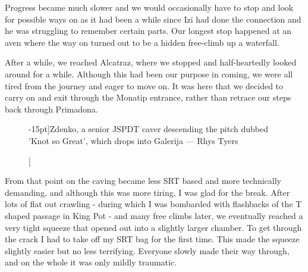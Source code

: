 Progress became much slower and we would occasionally have to stop and look for possible ways on as it had been a while since Izi had done the connection and he was struggling to remember certain parts. Our longest stop happened at an aven where the way on turned out to be a hidden free-climb up a waterfall.

After a while, we reached Alcatraz, where we stopped and half-heartedly looked around for a while. Although this had been our purpose in coming, we were all tired from the journey and eager to move on. It was here that we decided to carry on and exit through the Monatip entrance, rather than retrace our steps back through Primadona. 

\begin{figure}[t!]
\checkoddpage \ifoddpage \forcerectofloat \else \forceversofloat \fi
\centering
{}
\caption[][-15pt]{Zdenko, a senior JSPDT caver descending the pitch dubbed 'Knot so Great', which drops into Galerija --- Rhys Tyers}
\label{Zdenko16}
\end{figure}
From that point on the caving became less SRT based and more technically demanding, and although this was more tiring, I was glad for the break. After lots of flat out crawling - during which I was bombarded with flashbacks of the T shaped passage in King Pot - and many free climbs later, we eventually reached a very tight squeeze that opened out into a slightly larger chamber. To get through the crack I had to take off my SRT bag for the first time. This made the squeeze slightly easier but no less terrifying. Everyone slowly made their way through, and on the whole it was only mildly traumatic.

